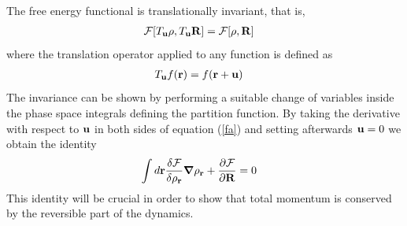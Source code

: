 \documentclass[b5paper,openright,10pt]{book}
\begin{document}
The free energy functional is translationally invariant, that is,
\begin{align}
  {\cal F}[T_{\bf u}\rho,T_{\bf u}{\bf R}]&=  {\cal F}[\rho,{\bf R}]
\label{fa}
\end{align}
where the translation operator applied to any function is defined as
\begin{align}
  T_{\bf u}f({\bf r})&=f({\bf r}+{\bf u})
\end{align}
The  invariance  can be  shown  by  performing  a suitable  change  of
variables  inside the  phase space  integrals defining  the partition
function.  By taking the derivative with  respect to ${\bf u}$ in both
sides of equation  (\ref{fa}) and  setting afterwards ${\bf u}=0$ we obtain
the identity
\begin{align}
  \int d{\bf r}\frac{\delta {\cal F}}{\delta \rho_{\bf r}}
\boldsymbol{\nabla}\rho_{\bf r}&+\frac{\partial {\cal F}}{\partial {\bf R}}=0
\label{iden1}
\end{align}
This  identity will be  crucial in  order to  show that  total  momentum is
conserved by  the reversible part  of the dynamics.  
\end{document}
